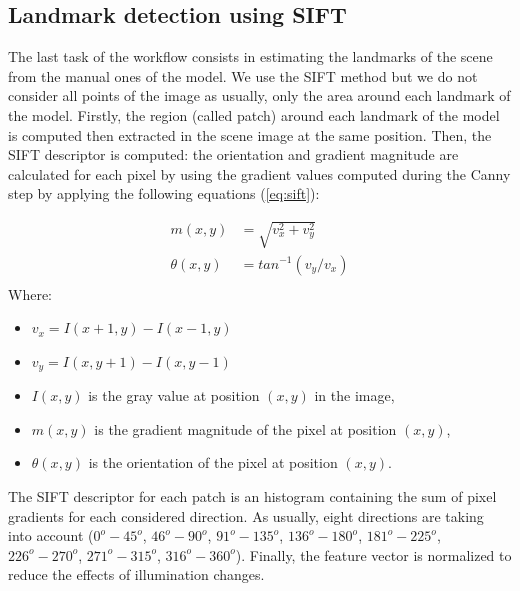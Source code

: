 \documentclass[twoside,twocolumn,10pt]{article}
\begin{document}
\subsection{Landmark detection using SIFT}

The last task of the workflow consists in estimating the landmarks of the scene from the manual ones of the model.
We use the SIFT method \cite{lowe2004distinctive} but we do not consider all points of the image as usually, only the area around each landmark of the model.
Firstly, the region (called patch) around each landmark of the model is computed then extracted in the scene image at the same position.
Then, the SIFT descriptor is computed: the orientation and gradient magnitude are calculated for each pixel by using the gradient values computed during the Canny step by applying the following equations (\ref{eq:sift}):

\begin{equation}
\label{eq:sift}
\begin{split}
	m(x,y) &= \sqrt{v_x^2 + v_y^2} \\
	\theta(x,y)& = tan^{-1}(v_y/v_x) \\
\end{split}
\end{equation}
Where:
\begin{itemize}[nosep,label=\footnotesize$\bullet$]
	\item $v_x = I(x+1,y) - I(x-1,y)$
	\item $v_y = I(x,y+1) - I(x,y-1)$
	\item $I(x,y)$ is the gray value at position $(x,y)$ in the image,
	\item $m(x,y)$ is the gradient magnitude of the pixel at position $(x,y)$,
	\item $\theta(x,y)$ is the orientation of the pixel at position $(x,y)$.
\end{itemize}
The SIFT descriptor for each patch is an histogram containing the sum of pixel gradients for each considered direction.
As usually, eight directions are taking into account ($0^o - 45^o$, $46^o - 90^o$, $91^o - 135^o$, $136^o - 180^o$, $181^o - 225^o$, $226^o - 270^o$, $271^o - 315^o$, $316^o - 360^o$). Finally, the feature vector is normalized to reduce the effects of illumination changes.
\end{document}
